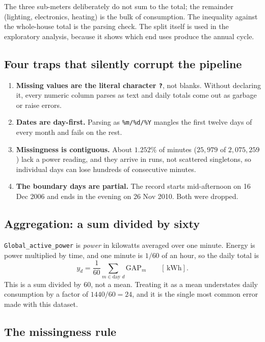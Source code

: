 \documentclass[11pt]{article}
\newcommand{\kwh}{\,\mathrm{kWh}}
\newcommand{\code}[1]{\texttt{\small #1}}
\begin{document}
The three sub-meters deliberately do not sum to the total; the remainder
(lighting, electronics, heating) is the bulk of consumption. The inequality
against the whole-house total is the parsing check. The split itself is used
in the exploratory analysis, because it shows which end uses produce the
annual cycle.

\subsection{Four traps that silently corrupt the pipeline}

\begin{enumerate}[leftmargin=*]
\item \textbf{Missing values are the literal character \code{?}}, not blanks.
Without declaring it, every numeric column parses as text and daily totals
come out as garbage or raise errors.
\item \textbf{Dates are day-first.} Parsing as \code{\%m/\%d/\%Y} mangles the
first twelve days of every month and fails on the rest.
\item \textbf{Missingness is contiguous.} About $1.252\%$ of minutes
($25{,}979$ of $2{,}075{,}259$) lack a power reading, and they arrive in runs,
not scattered singletons, so individual days can lose hundreds of consecutive
minutes.
\item \textbf{The boundary days are partial.} The record starts mid-afternoon
on 16 Dec 2006 and ends in the evening on 26 Nov 2010. Both were dropped.
\end{enumerate}

\subsection{Aggregation: a sum divided by sixty}

\code{Global\_active\_power} is \emph{power} in kilowatts averaged over one
minute. Energy is power multiplied by time, and one minute is $1/60$ of an
hour, so the daily total is
\begin{equation}
y_d = \frac{1}{60}\sum_{m \in \text{day } d} \text{GAP}_m \qquad [\kwh].
\label{eq:agg}
\end{equation}
This is a sum divided by $60$, not a mean. Treating it as a mean understates
daily consumption by a factor of $1440/60 = 24$, and it is the single most
common error made with this dataset.

\subsection{The missingness rule}
\end{document}
